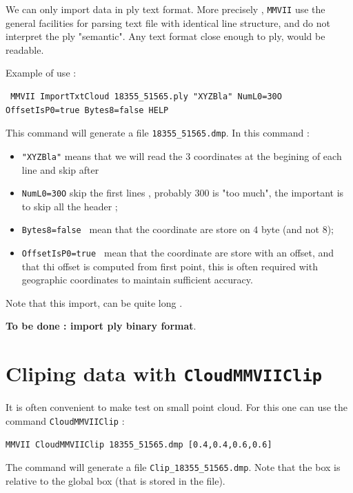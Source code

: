 We can only import  data in ply text format.  More precisely , {\tt MMVII} use the general facilities
for parsing text file with identical line structure, and do not interpret the ply "semantic". Any text format
close enough to ply, would be readable.

Example of use :

\begin{verbatim}
 MMVII ImportTxtCloud 18355_51565.ply "XYZBla" NumL0=30O OffsetIsP0=true Bytes8=false HELP
\end{verbatim}

This command will generate a file {\tt 18355\_51565.dmp}.
In this command :

\begin{itemize}
   \item {\tt "XYZBla"}  means that we will read the 3 coordinates at the begining of each line and skip after
   \item {\tt NumL0=30O}  skip the first lines , probably $300$ is "too much", the important is to skip all the header ;
   \item {\tt Bytes8=false }  mean that the coordinate are store on $4$ byte (and not $8$);
   \item {\tt  OffsetIsP0=true }  mean that the coordinate are store with an offset, and that thi offset is computed
         from first point, this is often required with geographic coordinates to maintain sufficient accuracy.
\end{itemize}

Note that this import, can be quite long .

{\bf To be done : import ply binary format}.


\section{Cliping data with  {\tt CloudMMVIIClip}}

It is often convenient to make test on small point cloud.  For this one can use the
command {\tt CloudMMVIIClip} :


\begin{verbatim}
MMVII CloudMMVIIClip 18355_51565.dmp [0.4,0.4,0.6,0.6]
\end{verbatim}

The command will generate a file {\tt  Clip\_18355\_51565.dmp}.  Note that the box is relative to the global
box (that is stored in the file).


